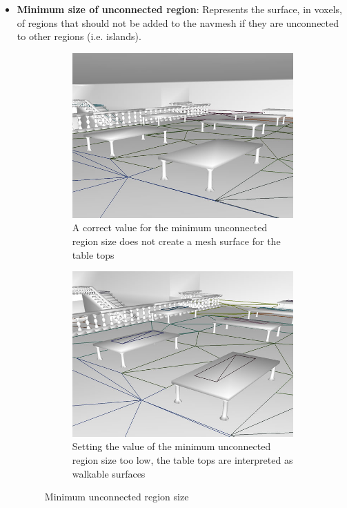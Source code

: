 \documentclass[a4paper,11pt]{article}
\begin{document}
\begin{itemize}
  
  \item\textbf{Minimum size of unconnected region}: Represents the surface, in voxels, of regions that should not be added to the navmesh if they are unconnected to other regions (i.e. islands).
  
  

\begin{figure}[H]
        \centering
        \begin{subfigure}[b]{0.49\textwidth}
                \centering
                \includegraphics[width=\textwidth]{min_unconn_region_0.png}
                \caption{A correct value for the minimum unconnected region size does not create a mesh surface for the table tops}
        \end{subfigure}
        \begin{subfigure}[b]{0.49\textwidth}
                \centering
                \includegraphics[width=\textwidth]{min_unconn_region_1.png}
                \caption{Setting the value of the minimum unconnected region size too low, the table tops are interpreted as walkable surfaces}
        \end{subfigure}
        \caption{Minimum unconnected region size}
	\end{figure}        



\end{itemize}
\end{document}
